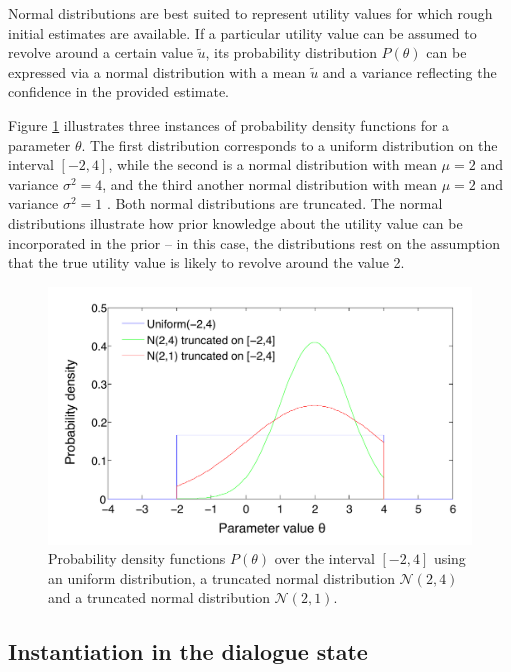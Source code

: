 Normal distributions are best suited to represent utility values for which rough initial estimates are available. If a particular utility value can be assumed to revolve around a certain value $\tilde{u}$, its probability distribution $P(\theta)$ can be expressed via a normal distribution with a mean $\tilde{u}$ and a variance reflecting the confidence in the provided estimate. 

Figure \ref{fig:uniformn} illustrates three instances of probability density functions for a parameter $\theta$.  The first distribution corresponds to a uniform distribution on the interval $[-2,4]$, while the second is a normal distribution with mean $\mu=2$ and variance $\sigma^2=4$, and the third another normal distribution  with mean $\mu=2$ and variance $\sigma^2=1$ .  Both normal distributions are truncated. The normal distributions illustrate how prior knowledge about the utility value can be incorporated in the prior -- in this case, the distributions rest on the assumption that the true utility value is likely to revolve around the value 2. 

\begin{figure}[h]
\centering
\includegraphics[scale=0.4]{imgs/uniformn.pdf}
\caption{Probability density functions $P(\theta)$ over the interval $[-2,4]$ using an uniform distribution, a truncated normal distribution $\mathcal{N}(2,4)$ and a truncated normal distribution $\mathcal{N}(2,1)$.} 
\label{fig:uniformn}
\end{figure}

\subsection{Instantiation in the dialogue state}
\label{sec:rule-params-instantiation}

